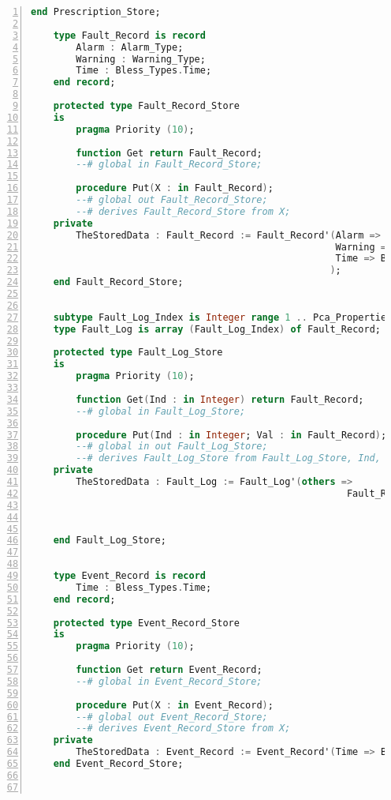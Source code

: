 \begin{lstlisting}[language=ada, gobble=0, numbers=left, caption={\lstinline{Pca_Types} package}]
    end Prescription_Store;

    type Fault_Record is record
        Alarm : Alarm_Type;
        Warning : Warning_Type;
        Time : Bless_Types.Time;
    end record;

    protected type Fault_Record_Store
    is
        pragma Priority (10);

        function Get return Fault_Record;
        --# global in Fault_Record_Store;

        procedure Put(X : in Fault_Record);
        --# global out Fault_Record_Store;
        --# derives Fault_Record_Store from X;
    private
        TheStoredData : Fault_Record := Fault_Record'(Alarm => Alarm_Type'First,
                                                      Warning => Warning_Type'First,
                                                      Time => Bless_Types.Time'First
                                                     );
    end Fault_Record_Store;


    subtype Fault_Log_Index is Integer range 1 .. Pca_Properties.Fault_Log_Size;
    type Fault_Log is array (Fault_Log_Index) of Fault_Record;

    protected type Fault_Log_Store
    is
        pragma Priority (10);

        function Get(Ind : in Integer) return Fault_Record;
        --# global in Fault_Log_Store;

        procedure Put(Ind : in Integer; Val : in Fault_Record);
        --# global in out Fault_Log_Store;
        --# derives Fault_Log_Store from Fault_Log_Store, Ind, Val;
    private
        TheStoredData : Fault_Log := Fault_Log'(others =>
                                                        Fault_Record'(Alarm => Alarm_Type'First,
                                                                      Warning => Warning_Type'First,
                                                                      Time => Bless_Types.Time'First
                                                                     ));
    end Fault_Log_Store;


    type Event_Record is record
        Time : Bless_Types.Time;
    end record;

    protected type Event_Record_Store
    is
        pragma Priority (10);

        function Get return Event_Record;
        --# global in Event_Record_Store;

        procedure Put(X : in Event_Record);
        --# global out Event_Record_Store;
        --# derives Event_Record_Store from X;
    private
        TheStoredData : Event_Record := Event_Record'(Time => Bless_Types.Time'First);
    end Event_Record_Store;



\end{lstlisting}
